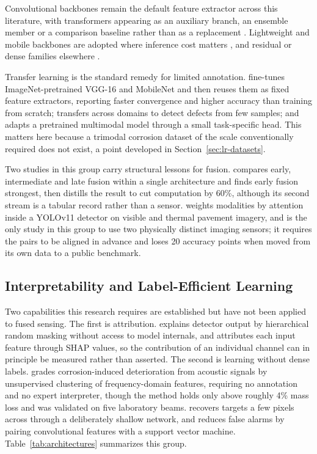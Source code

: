 Convolutional backbones remain the default feature extractor across this
literature, with transformers appearing as an auxiliary branch, an ensemble
member or a comparison baseline rather than as a replacement
\citep{Song2024,Gao2023,Zhang2026b,Bechis2026,Yamaguchi2024,Chowdhury2026,Su2024,Kharyuk2026}. Lightweight and mobile backbones are adopted
where inference cost matters \citep{Liu2026a,Mirzaei2025}, and residual or dense families
elsewhere \citep{Zhang2024,Yamaguchi2024,Su2024}.

Transfer learning is the standard remedy for limited annotation. \citet{Su2024}
fine-tunes ImageNet-pretrained VGG-16 and MobileNet and then reuses them as fixed
feature extractors, reporting faster convergence and higher accuracy than
training from scratch; \citet{Gong2022} transfers across domains to detect defects from
few samples; and \citet{Zhang2026c} adapts a pretrained multimodal model through a small
task-specific head. This matters here because a trimodal corrosion dataset of the
scale conventionally required does not exist, a point developed in
Section~\ref{sec:lr-datasets}.

Two studies in this group carry structural lessons for fusion. \citet{Chowdhury2026} compares
early, intermediate and late fusion within a single architecture and finds early
fusion strongest, then distills the result to cut computation by 60\%, although
its second stream is a tabular record rather than a sensor. \citet{Zhang2026b} weights
modalities by attention inside a YOLOv11 detector on visible and thermal pavement
imagery, and is the only study in this group to use two physically distinct
imaging sensors; it requires the pairs to be aligned in advance and loses 20
accuracy points when moved from its own data to a public benchmark.

\subsection{Interpretability and Label-Efficient Learning}

Two capabilities this research requires are established but have not been applied
to fused sensing. The first is attribution. \citet{Moradi2024} explains detector output by
hierarchical random masking without access to model internals, and \citet{Persiya2025}
attributes each input feature through SHAP values, so the contribution of an
individual channel can in principle be measured rather than asserted. The second
is learning without dense labels. \citet{Phannakham2026} grades corrosion-induced deterioration
from acoustic signals by unsupervised clustering of frequency-domain features,
requiring no annotation and no expert interpreter, though the method holds only
above roughly 4\% mass loss and was validated on five laboratory beams. \citet{Mirzaei2025}
recovers targets a few pixels across through a deliberately shallow network, and
\citet{Hafdaoui2026} reduces false alarms by pairing convolutional features with a support
vector machine. Table~\ref{tab:architectures} summarizes this group.

